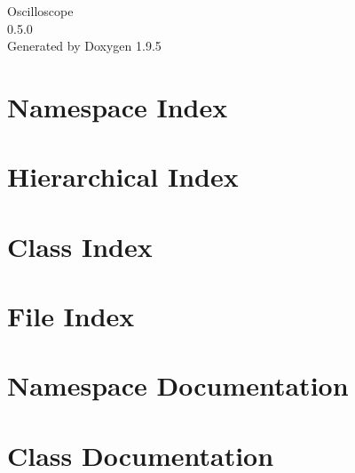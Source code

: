 \documentclass[twoside]{book}
\newcommand{\+}{\discretionary{\mbox{\scriptsize$\hookleftarrow$}}{}{}}
\newcommand{\clearemptydoublepage}{%
    \newpage{\pagestyle{empty}\cleardoublepage}%
  }
\begin{document}
  \raggedbottom
    \hypersetup{pageanchor=false,
                bookmarksnumbered=true,
                pdfencoding=unicode
               }
  \begin{titlepage}
  \vspace*{7cm}
  \begin{center}%
  {\Large Oscilloscope}\\
  [1ex]\large 0.\+5.\+0 \\
  \vspace*{1cm}
  {\large Generated by Doxygen 1.9.5}\\
  \end{center}
  \end{titlepage}
  \clearemptydoublepage
  \tableofcontents
  \clearemptydoublepage
  \hypersetup{pageanchor=true}
\chapter{Namespace Index}

\chapter{Hierarchical Index}

\chapter{Class Index}

\chapter{File Index}

\chapter{Namespace Documentation}

\chapter{Class Documentation}

















\end{document}
